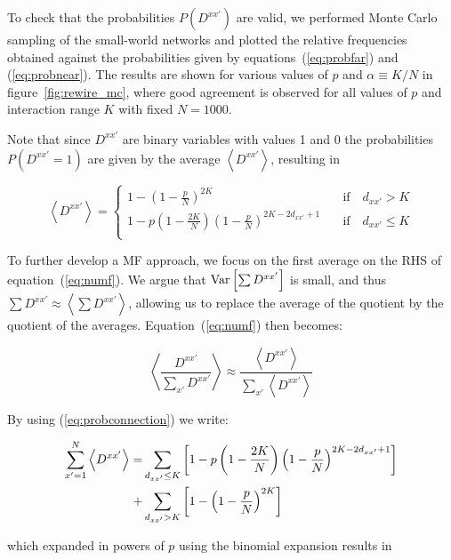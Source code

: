 To check that the probabilities $P(D^{xx'})$ are valid, we performed Monte Carlo sampling of the small-world networks and plotted the
relative frequencies obtained against the probabilities given by equations~(\ref{eq:probfar}) and (\ref{eq:probnear}). The results are
shown for various values of $p$ and $\alpha \equiv K/N$ in figure~\ref{fig:rewire_mc}, where good agreement is observed for all values
of $p$ and interaction range $K$ with fixed $N=1000$.

Note that since $D^{xx'}$ are binary variables with values 1 and 0 the probabilities $P(D^{xx'}=1)$ are given by the average
$\left<D^{xx'}\right>$, resulting in

\begin{equation}
  \left<D^{xx'}\right> =
  \begin{cases}
    1-\left( 1 - \frac{p}{N} \right)^{2K} \quad &\text{if} \quad d_{xx'}>K\\
    1-p\left( 1 - \frac{2K}{N} \right)\left( 1 - \frac{p}{N} \right)^{2K-2d_{xx'}+1} \quad &\text{if} \quad d_{xx'}\leq K\\
  \end{cases}
  \label{eq:probconnection}
\end{equation}

To further develop a MF approach, we focus on the first average on the RHS of equation~(\ref{eq:numf}). We argue that $\text{Var}\left[{\sum
D^{xx'}}\right]$ is small, and thus $\sum D^{xx'} \approx \left< \sum D^{xx'} \right>$, allowing us to replace the average of the quotient by
the quotient of the averages. Equation~(\ref{eq:numf}) then becomes:

\begin{equation}
    \left< \frac{D^{xx'}}{\sum_{x'}D^{xx'}} \right> \approx \frac{\left< D^{xx'} \right>}{\sum_{x'}\left< D^{xx'} \right>}
    \label{eq:avgquotient}
\end{equation}

\noindent By using (\ref{eq:probconnection}) we write:

\begin{align}
  \sum_{x'=1}^N \left< D^{xx'} \right> = &\sum_{d_{xx'}\leq K} \left[
  1 - p\left(1-\frac{2K}{N}\right)\left(1-\frac{p}{N}\right)^{2K - 2d_{xx'} + 1} \right] \notag\\
    + &\sum_{d_{xx'}>K} \left[ 1 - \left( 1 - \frac{p}{N} \right)^{2K} \right]
\end{align}

\noindent which expanded in powers of $p$ using the binomial expansion results in

